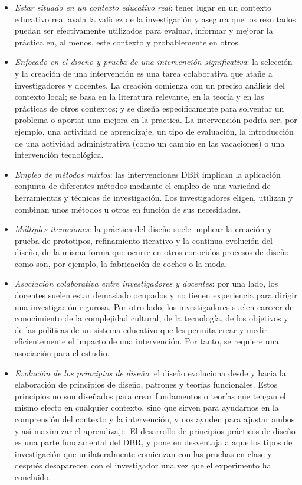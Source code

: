 \begin{itemize}
\item \emph{Estar situado en un contexto educativo real}: tener lugar en un contexto educativo real avala la validez de la investigación y asegura que los resultados puedan ser efectivamente utilizados para evaluar, informar y mejorar la práctica en, al menos, este contexto y probablemente en otros.
\item \emph{Enfocado en el diseño y prueba de una intervención significativa}: la selección y la creación de una intervención es una tarea colaborativa que atañe a investigadores y docentes. La creación comienza con un preciso análisis del contexto local; se basa en la literatura relevante, en la teoría y en las prácticas de otros contextos; y se diseña específicamente para solventar un problema o aportar una mejora en la practica. La intervención podría ser, por ejemplo, una actividad de aprendizaje, un tipo de evaluación, la introducción de una actividad administrativa (como un cambio en las vacaciones) o una intervención tecnológica. %
\item \emph{Empleo de métodos mixtos}: las intervenciones DBR implican la aplicación conjunta de diferentes métodos mediante el empleo de una variedad de herramientas y técnicas de investigación. Los investigadores eligen, utilizan y combinan unos métodos u otros en función de sus necesidades.
\item \emph{Múltiples iteraciones}: la práctica del diseño suele implicar la creación y prueba de prototipos, refinamiento iterativo y la continua evolución del diseño, de la misma forma que ocurre en otros conocidos procesos de diseño como son, por ejemplo, la fabricación de coches o la moda.
\item \emph{Asociación colaborativa entre investigadores y docentes}: por una lado, los docentes suelen estar demasiado ocupados y no tienen experiencia para dirigir una investigación rigurosa. Por otro lado, los investigadores suelen carecer de conocimiento de la complejidad cultural, de la tecnología, de los objetivos y de las políticas de un sistema educativo que les permita crear y medir eficientemente el impacto de una intervención. Por tanto, se requiere una asociación para el estudio.
\item \emph{Evolución de los principios de diseño}: el diseño evoluciona desde y hacia la elaboración de principios de diseño, patrones y teorías funcionales. Estos principios no son diseñados para crear fundamentos o teorías que tengan el mismo efecto en cualquier contexto, sino que sirven para ayudarnos en la comprensión del contexto y la intervención, y nos ayuden para ajustar ambos y así maximizar el aprendizaje.  El desarrollo de principios prácticos de diseño es una parte fundamental del DBR, y pone en desventaja a aquellos tipos de investigación que unilateralmente comienzan con las pruebas en clase y después desaparecen con el investigador una vez que el experimento ha concluido.

\end{itemize}
